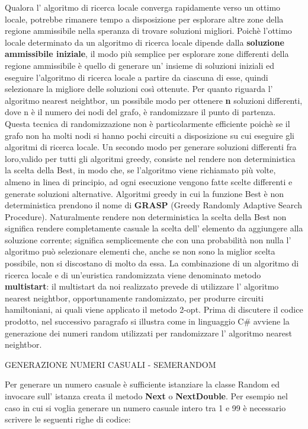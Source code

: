 \documentclass[11pt]{article}
\begin{document}
Qualora l' algoritmo di ricerca locale converga rapidamente verso un ottimo locale, potrebbe rimanere tempo a disposizione per esplorare altre zone della regione ammissibile nella speranza di trovare soluzioni migliori. Poichè  l'ottimo locale determinato da un algoritmo di ricerca locale dipende dalla \textbf{soluzione ammissibile iniziale}, il modo più semplice per esplorare zone differenti della regione ammissibile è quello di generare un' insieme di soluzioni iniziali ed eseguire l'algoritmo di ricerca locale a partire da ciascuna di esse, quindi selezionare la migliore delle soluzioni così ottenute. 
Per quanto riguarda l' algoritmo nearest neightbor, un possibile modo per ottenere \textbf{n} soluzioni differenti, dove n è il numero dei nodi del grafo, è randomizzare il punto di partenza. Questa tecnica di randomizzazione non è particolarmente efficiente poichè se il grafo non ha molti nodi si hanno pochi circuiti a disposizione su cui eseguire gli algoritmi di ricerca locale. 
Un secondo modo per generare soluzioni differenti fra loro,valido per tutti gli algoritmi greedy, consiste nel rendere non deterministica la scelta della Best, in modo che, se l'algoritmo viene richiamato più volte, almeno in linea di principio, ad ogni esecuzione vengono fatte scelte differenti e generate soluzioni alternative. Algoritmi greedy in cui la funzione  Best è non deterministica prendono il nome di \textbf{GRASP} (Greedy Randomly Adaptive Search Procedure). Naturalmente rendere non deterministica la scelta della Best non significa rendere completamente casuale la scelta dell' elemento da aggiungere alla soluzione corrente; significa semplicemente che con una probabilità non nulla l' algoritmo può selezionare elementi che, anche se non sono la miglior scelta possibile, non si discostano di molto da essa. La combinazione di un algoritmo di ricerca locale e di un'euristica randomizzata viene denominato metodo \textbf{multistart}: il multistart da noi realizzato prevede di utilizzare l' algoritmo nearest neightbor, opportunamente randomizzato, per produrre circuiti hamiltoniani, ai quali viene applicato il metodo  2-opt. Prima di discutere il codice prodotto, nel successivo paragrafo si illustra come in linguaggio C# avviene la generazione dei numeri random utilizzati per randomizzare l' algoritmo  nearest neightbor. 

\vspace{2\baselineskip}
GENERAZIONE NUMERI CASUALI - SEMERANDOM
\vspace{2\baselineskip}

Per generare un numero casuale è sufficiente istanziare la classe Random ed invocare sull' istanza creata il metodo \textbf{Next} o \textbf{NextDouble}. Per esempio nel caso in cui si voglia generare un numero casuale intero tra 1 e 99 è necessario scrivere le seguenti righe di codice:
\end{document}
